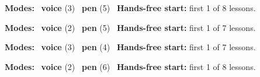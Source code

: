 \expandafter\def\csname hlchaptermodality24\endcsname{%
  {\small\noindent
    \textbf{Modes:} \hlvoicesign{}~\textbf{voice} (3) \quad \hlpensign{}~\textbf{pen} (5)\quad
    \hlvoicesign{}~\textbf{Hands-free start:} first 1 of 8 lessons.%
    \par}\medskip
}

\expandafter\def\csname hlchaptermodality25\endcsname{%
  {\small\noindent
    \textbf{Modes:} \hlvoicesign{}~\textbf{voice} (2) \quad \hlpensign{}~\textbf{pen} (5)\quad
    \hlvoicesign{}~\textbf{Hands-free start:} first 1 of 7 lessons.%
    \par}\medskip
}

\expandafter\def\csname hlchaptermodality26\endcsname{%
  {\small\noindent
    \textbf{Modes:} \hlvoicesign{}~\textbf{voice} (3) \quad \hlpensign{}~\textbf{pen} (4)\quad
    \hlvoicesign{}~\textbf{Hands-free start:} first 1 of 7 lessons.%
    \par}\medskip
}

\expandafter\def\csname hlchaptermodality27\endcsname{%
  {\small\noindent
    \textbf{Modes:} \hlvoicesign{}~\textbf{voice} (2) \quad \hlpensign{}~\textbf{pen} (6)\quad
    \hlvoicesign{}~\textbf{Hands-free start:} first 1 of 8 lessons.%
    \par}\medskip
}
